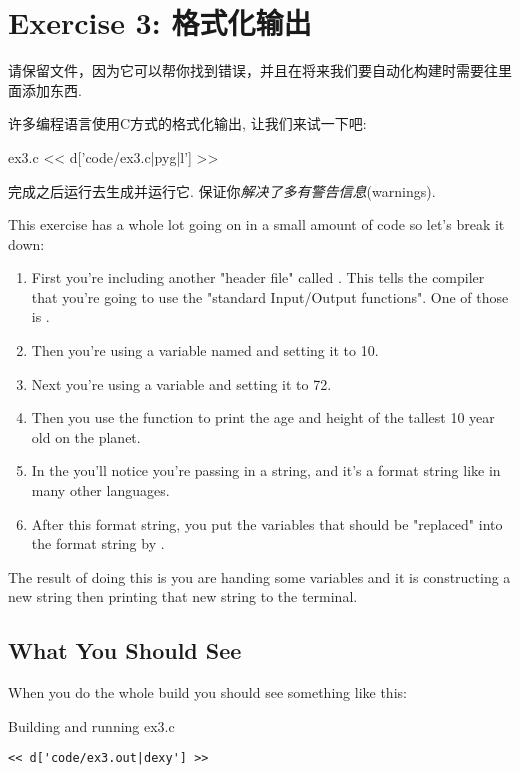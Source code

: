 \chapter{Exercise 3: 格式化输出}

请保留文件，因为它可以帮你找到错误，并且在将来我们要自动化构建时需要往里面添加东西.

许多编程语言使用C方式的格式化输出, 让我们来试一下吧:

\begin{code}{ex3.c}
<< d['code/ex3.c|pyg|l'] >>
\end{code}

完成之后运行去生成并运行它. 
保证你\emph{解决了多有警告信息}(warnings).

This exercise has a whole lot going on in a small amount of code so 
let's break it down:

\begin{enumerate}
\item First you're including another "header file" called . This tells the compiler that you're going to use the "standard Input/Output functions".  One of those is .
\item Then you're using a variable named  and setting it to 10.
\item Next you're using a variable  and setting it to 72.
\item Then you use the  function to print the age and height
     of the tallest 10 year old on the planet.
\item In the  you'll notice you're passing in a string, and
    it's a format string like in many other languages.
\item After this format string, you put the variables that should be 
    "replaced" into the format string by .
\end{enumerate}

The result of doing this is you are handing  some variables
and it is constructing a new string then printing that new string to the
terminal.

\section{What You Should See}

When you do the whole build you should see something like this:

\begin{Terminal}{Building and running ex3.c}
\begin{lstlisting}
<< d['code/ex3.out|dexy'] >>
\end{lstlisting}
\end{Terminal}

